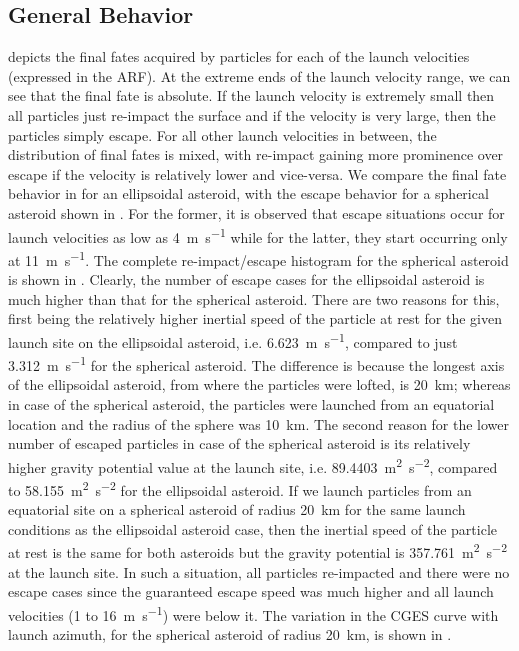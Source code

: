 \subsection{General Behavior}
\label{subsec:general_behavior_noSP}
 depicts the final fates acquired by particles for each of the launch velocities (expressed in the \gls{ARF}). At the extreme ends of the launch velocity range, we can see that the final fate is absolute. If the launch velocity is extremely small then all particles just re-impact the surface and if the velocity is very large, then the particles simply escape. For all other launch velocities in between, the distribution of final fates is mixed, with re-impact gaining more prominence over escape if the velocity is relatively lower and vice-versa.
%
\newline\newline
%
We compare the final fate behavior in  for an ellipsoidal asteroid, with the escape behavior for a spherical asteroid shown in . For the former, it is observed that escape situations occur for launch velocities as low as \SI{4}{\metre\per\second} while for the latter, they start occurring only at \SI{11}{\metre\per\second}. The complete re-impact/escape histogram for the spherical asteroid is shown in . Clearly, the number of escape cases for the ellipsoidal asteroid is much higher than that for the spherical asteroid. There are two reasons for this, first being the relatively higher inertial speed of the particle at rest for the given launch site on the ellipsoidal asteroid, i.e. \SI{6.623}{\metre\per\second}, compared to just \SI{3.312}{\metre\per\second} for the spherical asteroid. The difference is because the longest axis of the ellipsoidal asteroid, from where the particles were lofted, is \SI{20}{\kilo\metre}; whereas in case of the spherical asteroid, the particles were launched from an equatorial location and the radius of the sphere was \SI{10}{\kilo\metre}. The second reason for the lower number of escaped particles in case of the spherical asteroid is its relatively higher gravity potential value at the launch site, i.e. \SI{89.4403}{\metre\squared\per\second\squared}, compared to \SI{58.155}{\metre\squared\per\second\squared} for the ellipsoidal asteroid.
%
\newline\newline
%
If we launch particles from an equatorial site on a spherical asteroid of radius \SI{20}{\kilo\metre} for the same launch conditions as the ellipsoidal asteroid case, then the inertial speed of the particle at rest is the same for both asteroids but the gravity potential is \SI{357.761}{\metre\squared\per\second\squared} at the launch site. In such a situation, all particles re-impacted and there were no escape cases since the guaranteed escape speed was much higher and all launch velocities (1 to \SI{16}{\metre\per\second}) were below it. The variation in the \gls{CGES} curve with launch azimuth, for the spherical asteroid of radius \SI{20}{\kilo\metre}, is shown in .
